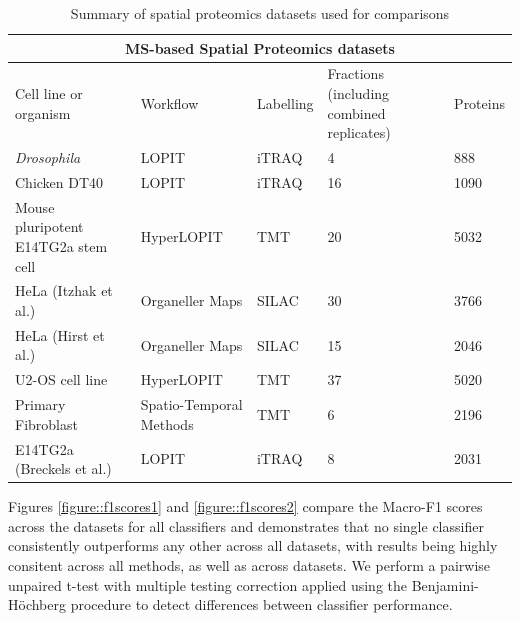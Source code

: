 \documentclass[12pt,english]{article}\usepackage[]{graphicx}\usepackage[]{color}
\begin{document}
\begin{table}[h]
\centering
\begin{tabular}{ |p{3cm}|p{3cm}|p{2cm}|p{2cm}|p{2cm}|  }
 \hline

 \multicolumn{5}{|c|}{MS-based Spatial Proteomics datasets} \\
 \hline
 Cell line or organism & Workflow & Labelling & Fractions (including combined replicates) & Proteins \\
 \hline
 \hline
 \textit{Drosophila}   &  LOPIT & iTRAQ & 4  & 888\\
 \hline
 Chicken DT40 & LOPIT  & iTRAQ & 16 & 1090 \\
 \hline
 Mouse pluripotent E14TG2a stem cell  &  HyperLOPIT & TMT & 20 & 5032\\
 \hline
 HeLa (Itzhak et al.) & Organeller Maps & SILAC & 30 & 3766\\
 \hline
 HeLa (Hirst et al.) & Organeller Maps  & SILAC & 15 & 2046\\
 \hline
 U2-OS cell line & HyperLOPIT  & TMT & 37 & 5020\\
 \hline
 Primary Fibroblast & Spatio-Temporal Methods & TMT & 6 & 2196 \\
 \hline
 E14TG2a (Breckels et al.)  &  LOPIT & iTRAQ & 8 & 2031\\
\hline
\end{tabular}
\caption{Summary of spatial proteomics datasets used for comparisons}
\label{table:data}
\end{table}

Figures \ref{figure::f1scores1} and \ref{figure::f1scores2} compare
the Macro-F1 scores across the datasets for all classifiers and
demonstrates that no single classifier consistently outperforms any
other across all datasets, with results being highly consitent across
all methods, as well as across datasets. We perform a pairwise
unpaired t-test with multiple testing correction applied using the
Benjamini-H\"ochberg procedure \citep{FDR:1995} to detect differences
between classifier performance.
\end{document}
